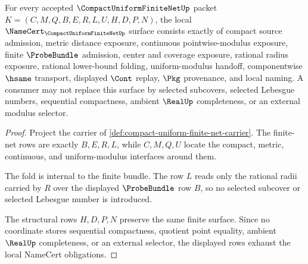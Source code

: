 \begin{theorem}
\label{thm:compact-uniform-finite-net-namecert-obligations}
For every accepted $\CompactUniformFiniteNetUp$ packet $K=(C,M,Q,B,E,R,L,U,H,D,P,N)$, the local $\NameCert_{\CompactUniformFiniteNetUp}$ surface consists exactly of compact source admission, metric distance exposure, continuous pointwise-modulus exposure, finite $\ProbeBundle$ admission, center and coverage exposure, rational radius exposure, rational lower-bound folding, uniform-modulus handoff, componentwise $\hsame$ transport, displayed $\Cont$ replay, $\Pkg$ provenance, and local naming. A consumer may not replace this surface by selected subcovers, selected Lebesgue numbers, sequential compactness, ambient $\RealUp$ completeness, or an external modulus selector.
\end{theorem}

\begin{proof}
Project the carrier of \autoref{def:compact-uniform-finite-net-carrier}. The finite-net rows are exactly $B,E,R,L$, while $C,M,Q,U$ locate the compact, metric, continuous, and uniform-modulus interfaces around them.

The fold is internal to the finite bundle. The row $L$ reads only the rational radii carried by $R$ over the displayed $\ProbeBundle$ row $B$, so no selected subcover or selected Lebesgue number is introduced.

The structural rows $H,D,P,N$ preserve the same finite surface. Since no coordinate stores sequential compactness, quotient point equality, ambient $\RealUp$ completeness, or an external selector, the displayed rows exhaust the local NameCert obligations.
\end{proof}



